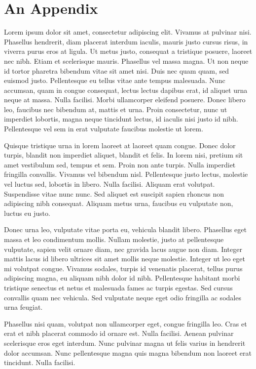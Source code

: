 \chapter{An Appendix}
Lorem ipsum dolor sit amet, consectetur adipiscing elit. Vivamus at pulvinar nisi. Phasellus hendrerit, diam placerat interdum iaculis, mauris justo cursus risus, in viverra purus eros at ligula. Ut metus justo, consequat a tristique posuere, laoreet nec nibh. Etiam et scelerisque mauris. Phasellus vel massa magna. Ut non neque id tortor pharetra bibendum vitae sit amet nisi. Duis nec quam quam, sed euismod justo. Pellentesque eu tellus vitae ante tempus malesuada. Nunc accumsan, quam in congue consequat, lectus lectus dapibus erat, id aliquet urna neque at massa. Nulla facilisi. Morbi ullamcorper eleifend posuere. Donec libero leo, faucibus nec bibendum at, mattis et urna. Proin consectetur, nunc ut imperdiet lobortis, magna neque tincidunt lectus, id iaculis nisi justo id nibh. Pellentesque vel sem in erat vulputate faucibus molestie ut lorem.

Quisque tristique urna in lorem laoreet at laoreet quam congue. Donec dolor turpis, blandit non imperdiet aliquet, blandit et felis. In lorem nisi, pretium sit amet vestibulum sed, tempus et sem. Proin non ante turpis. Nulla imperdiet fringilla convallis. Vivamus vel bibendum nisl. Pellentesque justo lectus, molestie vel luctus sed, lobortis in libero. Nulla facilisi. Aliquam erat volutpat. Suspendisse vitae nunc nunc. Sed aliquet est suscipit sapien rhoncus non adipiscing nibh consequat. Aliquam metus urna, faucibus eu vulputate non, luctus eu justo.

Donec urna leo, vulputate vitae porta eu, vehicula blandit libero. Phasellus eget massa et leo condimentum mollis. Nullam molestie, justo at pellentesque vulputate, sapien velit ornare diam, nec gravida lacus augue non diam. Integer mattis lacus id libero ultrices sit amet mollis neque molestie. Integer ut leo eget mi volutpat congue. Vivamus sodales, turpis id venenatis placerat, tellus purus adipiscing magna, eu aliquam nibh dolor id nibh. Pellentesque habitant morbi tristique senectus et netus et malesuada fames ac turpis egestas. Sed cursus convallis quam nec vehicula. Sed vulputate neque eget odio fringilla ac sodales urna feugiat.

Phasellus nisi quam, volutpat non ullamcorper eget, congue fringilla leo. Cras et erat et nibh placerat commodo id ornare est. Nulla facilisi. Aenean pulvinar scelerisque eros eget interdum. Nunc pulvinar magna ut felis varius in hendrerit dolor accumsan. Nunc pellentesque magna quis magna bibendum non laoreet erat tincidunt. Nulla facilisi.


